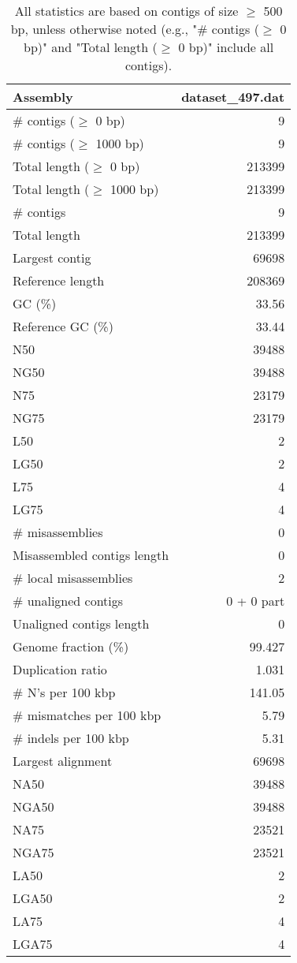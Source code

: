 \documentclass[12pt,a4paper]{article}
\begin{document}
\begin{table}[ht]
\begin{center}
\caption{All statistics are based on contigs of size $\geq$ 500 bp, unless otherwise noted (e.g., "\# contigs ($\geq$ 0 bp)" and "Total length ($\geq$ 0 bp)" include all contigs).}
\begin{tabular}{|l*{1}{|r}|}
\hline
Assembly & dataset\_497.dat \\ \hline
\# contigs ($\geq$ 0 bp) & 9 \\ \hline
\# contigs ($\geq$ 1000 bp) & 9 \\ \hline
Total length ($\geq$ 0 bp) & 213399 \\ \hline
Total length ($\geq$ 1000 bp) & 213399 \\ \hline
\# contigs & 9 \\ \hline
Total length & 213399 \\ \hline
Largest contig & 69698 \\ \hline
Reference length & 208369 \\ \hline
GC (\%) & 33.56 \\ \hline
Reference GC (\%) & 33.44 \\ \hline
N50 & 39488 \\ \hline
NG50 & 39488 \\ \hline
N75 & 23179 \\ \hline
NG75 & 23179 \\ \hline
L50 & 2 \\ \hline
LG50 & 2 \\ \hline
L75 & 4 \\ \hline
LG75 & 4 \\ \hline
\# misassemblies & 0 \\ \hline
Misassembled contigs length & 0 \\ \hline
\# local misassemblies & 2 \\ \hline
\# unaligned contigs & 0 + 0 part \\ \hline
Unaligned contigs length & 0 \\ \hline
Genome fraction (\%) & 99.427 \\ \hline
Duplication ratio & 1.031 \\ \hline
\# N's per 100 kbp & 141.05 \\ \hline
\# mismatches per 100 kbp & 5.79 \\ \hline
\# indels per 100 kbp & 5.31 \\ \hline
Largest alignment & 69698 \\ \hline
NA50 & 39488 \\ \hline
NGA50 & 39488 \\ \hline
NA75 & 23521 \\ \hline
NGA75 & 23521 \\ \hline
LA50 & 2 \\ \hline
LGA50 & 2 \\ \hline
LA75 & 4 \\ \hline
LGA75 & 4 \\ \hline
\end{tabular}
\end{center}
\end{table}
\end{document}
